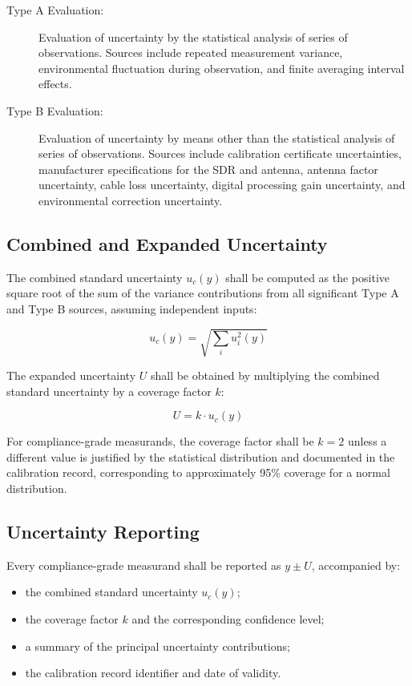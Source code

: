 \documentclass[11pt]{report}
\begin{document}
\begin{description}
	\item[Type A Evaluation:] Evaluation of uncertainty by the statistical analysis of series of observations. Sources include repeated measurement variance, environmental fluctuation during observation, and finite averaging interval effects.
	\item[Type B Evaluation:] Evaluation of uncertainty by means other than the statistical analysis of series of observations. Sources include calibration certificate uncertainties, manufacturer specifications for the SDR and antenna, antenna factor uncertainty, cable loss uncertainty, digital processing gain uncertainty, and environmental correction uncertainty.
\end{description}

\subsection*{Combined and Expanded Uncertainty}

The combined standard uncertainty $u_c(y)$ shall be computed as the positive square root of the sum of the variance contributions from all significant Type A and Type B sources, assuming independent inputs:

\[
u_c(y) = \sqrt{\sum_{i} u_i^2(y)}
\]

The expanded uncertainty $U$ shall be obtained by multiplying the combined standard uncertainty by a coverage factor $k$:

\[
U = k \cdot u_c(y)
\]

For compliance-grade measurands, the coverage factor shall be $k=2$ unless a different value is justified by the statistical distribution and documented in the calibration record, corresponding to approximately 95\% coverage for a normal distribution.

\subsection*{Uncertainty Reporting}

Every compliance-grade measurand shall be reported as $y \pm U$, accompanied by:
\begin{itemize}
	\item the combined standard uncertainty $u_c(y)$;
	\item the coverage factor $k$ and the corresponding confidence level;
	\item a summary of the principal uncertainty contributions;
	\item the calibration record identifier and date of validity.
\end{itemize}
\end{document}
